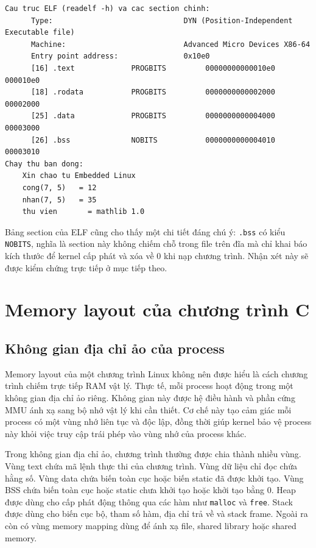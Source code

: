 \documentclass[11pt]{article}
\newcommand{\code}[1]{\texttt{#1}}
\begin{document}
\begin{lstlisting}[caption={Các section chính trong file ELF và kết quả chạy}]
Cau truc ELF (readelf -h) va cac section chinh:
      Type:                              DYN (Position-Independent Executable file)
      Machine:                           Advanced Micro Devices X86-64
      Entry point address:               0x10e0
      [16] .text             PROGBITS         00000000000010e0  000010e0
      [18] .rodata           PROGBITS         0000000000002000  00002000
      [25] .data             PROGBITS         0000000000004000  00003000
      [26] .bss              NOBITS           0000000000004010  00003010
Chay thu ban dong:
    Xin chao tu Embedded Linux
    cong(7, 5)   = 12
    nhan(7, 5)   = 35
    thu vien       = mathlib 1.0
\end{lstlisting}

Bảng section của ELF cũng cho thấy một chi tiết đáng chú ý: \code{.bss} có kiểu \code{NOBITS}, nghĩa là section này không chiếm chỗ trong file trên đĩa mà chỉ khai báo kích thước để kernel cấp phát và xóa về 0 khi nạp chương trình. Nhận xét này sẽ được kiểm chứng trực tiếp ở mục tiếp theo.

\section{Memory layout của chương trình C}

\subsection{Không gian địa chỉ ảo của process}

Memory layout của một chương trình Linux không nên được hiểu là cách chương trình chiếm trực tiếp RAM vật lý. Thực tế, mỗi process hoạt động trong một không gian địa chỉ ảo riêng. Không gian này được hệ điều hành và phần cứng MMU ánh xạ sang bộ nhớ vật lý khi cần thiết. Cơ chế này tạo cảm giác mỗi process có một vùng nhớ liên tục và độc lập, đồng thời giúp kernel bảo vệ process này khỏi việc truy cập trái phép vào vùng nhớ của process khác.

Trong không gian địa chỉ ảo, chương trình thường được chia thành nhiều vùng. Vùng text chứa mã lệnh thực thi của chương trình. Vùng dữ liệu chỉ đọc chứa hằng số. Vùng data chứa biến toàn cục hoặc biến static đã được khởi tạo. Vùng BSS chứa biến toàn cục hoặc static chưa khởi tạo hoặc khởi tạo bằng 0. Heap được dùng cho cấp phát động thông qua các hàm như \code{malloc} và \code{free}. Stack được dùng cho biến cục bộ, tham số hàm, địa chỉ trả về và stack frame. Ngoài ra còn có vùng memory mapping dùng để ánh xạ file, shared library hoặc shared memory.
\end{document}
